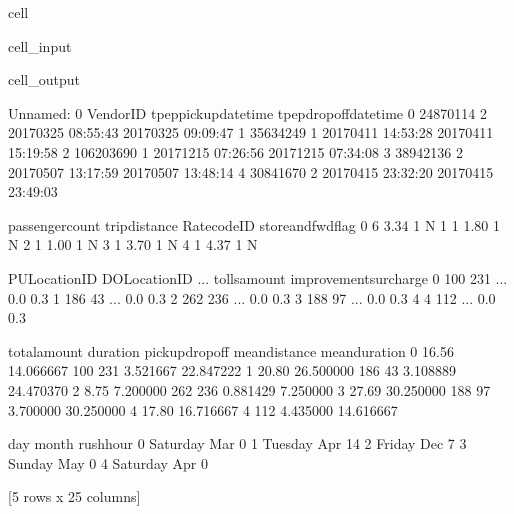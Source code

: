 \documentclass[letterpaper,10pt,english]{sphinxmanual}
\begin{document}
\begin{sphinxuseclass}{cell}
\begin{sphinxuseclass}{cell_input}
\begin{sphinxVerbatim}[commandchars=\\\{\}]
\end{sphinxVerbatim}

\end{sphinxuseclass}
\begin{sphinxuseclass}{cell_output}
\begin{sphinxVerbatim}[commandchars=\\\{\}]
   Unnamed: 0  VendorID tpep\PYGZus{}pickup\PYGZus{}datetime tpep\PYGZus{}dropoff\PYGZus{}datetime  \PYGZbs{}
0    24870114         2  2017\PYGZhy{}03\PYGZhy{}25 08:55:43   2017\PYGZhy{}03\PYGZhy{}25 09:09:47   
1    35634249         1  2017\PYGZhy{}04\PYGZhy{}11 14:53:28   2017\PYGZhy{}04\PYGZhy{}11 15:19:58   
2   106203690         1  2017\PYGZhy{}12\PYGZhy{}15 07:26:56   2017\PYGZhy{}12\PYGZhy{}15 07:34:08   
3    38942136         2  2017\PYGZhy{}05\PYGZhy{}07 13:17:59   2017\PYGZhy{}05\PYGZhy{}07 13:48:14   
4    30841670         2  2017\PYGZhy{}04\PYGZhy{}15 23:32:20   2017\PYGZhy{}04\PYGZhy{}15 23:49:03   

   passenger\PYGZus{}count  trip\PYGZus{}distance  RatecodeID store\PYGZus{}and\PYGZus{}fwd\PYGZus{}flag  \PYGZbs{}
0                6           3.34           1                  N   
1                1           1.80           1                  N   
2                1           1.00           1                  N   
3                1           3.70           1                  N   
4                1           4.37           1                  N   

   PULocationID  DOLocationID  ...  tolls\PYGZus{}amount  improvement\PYGZus{}surcharge  \PYGZbs{}
0           100           231  ...           0.0                    0.3   
1           186            43  ...           0.0                    0.3   
2           262           236  ...           0.0                    0.3   
3           188            97  ...           0.0                    0.3   
4             4           112  ...           0.0                    0.3   

   total\PYGZus{}amount   duration  pickup\PYGZus{}dropoff  mean\PYGZus{}distance  mean\PYGZus{}duration  \PYGZbs{}
0         16.56  14.066667         100 231       3.521667      22.847222   
1         20.80  26.500000          186 43       3.108889      24.470370   
2          8.75   7.200000         262 236       0.881429       7.250000   
3         27.69  30.250000          188 97       3.700000      30.250000   
4         17.80  16.716667           4 112       4.435000      14.616667   

        day  month rush\PYGZus{}hour  
0  Saturday    Mar         0  
1   Tuesday    Apr        14  
2    Friday    Dec         7  
3    Sunday    May         0  
4  Saturday    Apr         0  

[5 rows x 25 columns]
\end{sphinxVerbatim}

\end{sphinxuseclass}
\end{sphinxuseclass}
\end{document}
